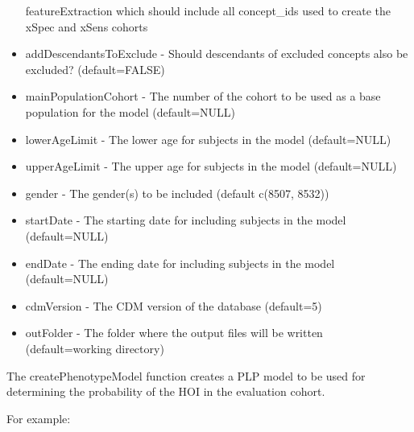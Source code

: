 \documentclass[]{article}
\begin{document}
\begin{itemize}
  featureExtraction which should include all concept\_ids used to create
  the xSpec and xSens cohorts
\item
  addDescendantsToExclude - Should descendants of excluded concepts also
  be excluded? (default=FALSE)
\item
  mainPopulationCohort - The number of the cohort to be used as a base
  population for the model (default=NULL)
\item
  lowerAgeLimit - The lower age for subjects in the model (default=NULL)
\item
  upperAgeLimit - The upper age for subjects in the model (default=NULL)
\item
  gender - The gender(s) to be included (default c(8507, 8532))
\item
  startDate - The starting date for including subjects in the model
  (default=NULL)
\item
  endDate - The ending date for including subjects in the model
  (default=NULL)
\item
  cdmVersion - The CDM version of the database (default=5)
\item
  outFolder - The folder where the output files will be written
  (default=working directory)
\end{itemize}

The createPhenotypeModel function creates a PLP model to be used for
determining the probability of the HOI in the evaluation cohort.

For example:
\end{document}
